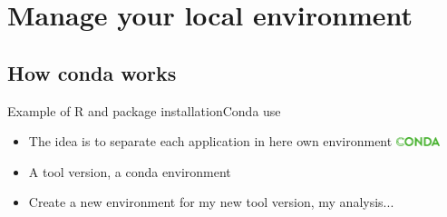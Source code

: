 \section{Manage your local environment}
\subsection{How conda works}
\begin{frame}[<+->]{Example of R and package installation}{Conda use}
\begin{itemize}
	\item The idea is to separate each application in here own environment \includegraphics[width=0.1\textwidth]{images/conda_logo.pdf}
	\item A tool version, a conda environment
	\item Create a new environment for my new tool version, my analysis...
\end{itemize}
\end{frame}
